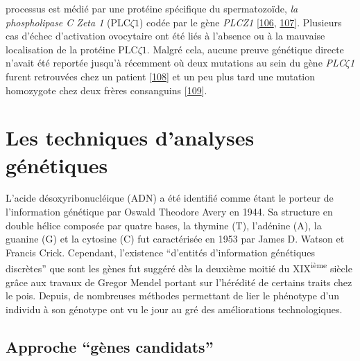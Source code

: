 \documentclass[12pt,a4paper,twoside]{ugathesis}
\theoremstyle{definition}
\theoremstyle{definition}
\theoremstyle{definition}
\theoremstyle{remark}
\begin{document}
\begin{enumerate}
  processus est médié par une protéine spécifique du spermatozoïde,
  \emph{la phospholipase C Zeta 1} (PLC\(\zeta 1\)) codée par le gène
  \emph{PLCZ1} {[}\protect\hyperlink{ref-Nomikos2013}{106},
  \protect\hyperlink{ref-Amdani2013}{107}{]}. Plusieurs cas d'échec
  d'activation ovocytaire ont été liés à l'absence ou à la mauvaise
  localisation de la protéine PLC\(\zeta1\). Malgré cela, aucune preuve
  génétique directe n'avait été reportée jusqu'à récemment où deux
  mutations au sein du gène \emph{PLC}\(\zeta\)\emph{1} furent
  retrouvées chez un patient
  {[}\protect\hyperlink{ref-Heytens2009}{108}{]} et un peu plus tard une
  mutation homozygote chez deux frères consanguins
  {[}\protect\hyperlink{ref-Escoffier2016}{109}{]}.
\end{enumerate}

\newpage  

\section{Les techniques d'analyses
génétiques}\label{les-techniques-danalyses-genetiques}

L'acide désoxyribonucléique (ADN) a été identifié comme étant le porteur
de l'information génétique par Oswald Theodore Avery en 1944. Sa
structure en double hélice composée par quatre bases, la thymine (T),
l'adénine (A), la guanine (G) et la cytosine (C) fut caractérisée en
1953 par James D. Watson et Francis Crick. Cependant, l'existence
``d'entités d'information génétiques discrètes'' que sont les gènes fut
suggéré dès la deuxième moitié du XIX\textsuperscript{ième} siècle grâce
aux travaux de Gregor Mendel portant sur l'hérédité de certains traits
chez le pois. Depuis, de nombreuses méthodes permettant de lier le
phénotype d'un individu à son génotype ont vu le jour au gré des
améliorations technologiques.

\subsection{\texorpdfstring{Approche ``gènes
candidats''}{Approche gènes candidats}}\label{approche-genes-candidats}
\end{document}
